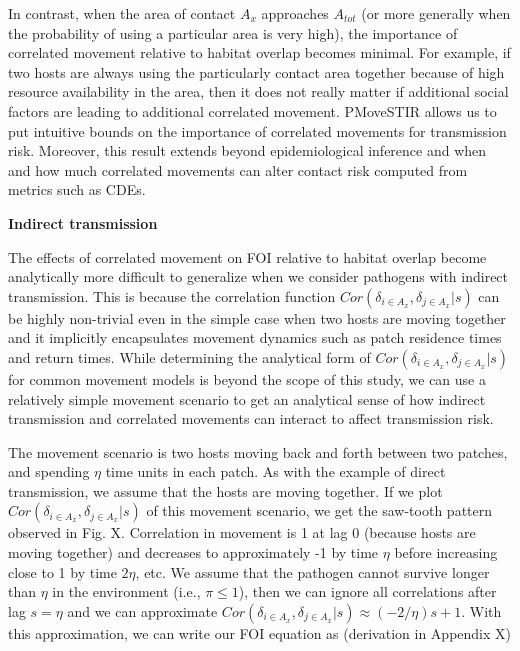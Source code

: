 \documentclass[letterpaper]{article}
\begin{document}
In contrast, when the area of contact $A_x$ approaches $A_{tot}$ (or more generally when the probability of using a particular area is very high), the importance of correlated movement relative to habitat overlap becomes minimal. For example, if two hosts are always using the particularly contact area together because of high resource availability in the area, then it does not really matter if additional social factors are leading to additional correlated movement. PMoveSTIR allows us to put intuitive bounds on the importance of correlated movements for transmission risk. Moreover, this result extends beyond epidemiological inference and when and how much correlated movements can alter contact risk computed from metrics such as CDEs.

\smallskip
\noindent
\textbf{Indirect transmission}

The effects of correlated movement on FOI relative to habitat overlap become analytically more difficult to generalize when we consider pathogens with indirect transmission.  This is because the correlation function $Cor(\delta_{i \in A_x}, \delta_{j \in A_x} | s)$ can be highly non-trivial even in the simple case when two hosts are moving together and it implicitly encapsulates movement dynamics such as patch residence times and return times.  While determining the analytical form of $Cor(\delta_{i \in A_x}, \delta_{j \in A_x} | s)$ for common movement models is beyond the scope of this study, we can use a relatively simple movement scenario to get an analytical sense of how indirect transmission and correlated movements can interact to affect transmission risk.

The movement scenario is two hosts moving back and forth between two patches, and spending $\eta$ time units in each patch.  As with the example of direct transmission, we assume that the hosts are moving together. If we plot $Cor(\delta_{i \in A_x}, \delta_{j \in A_x} | s)$ of this movement scenario, we get the saw-tooth pattern observed in Fig. X.  Correlation in movement is 1 at lag 0 (because hosts are moving together) and decreases to approximately -1 by time $\eta$ before increasing close to 1 by time $2\eta$, etc. We assume that the pathogen cannot survive longer than $\eta$ in the environment (i.e., $\pi \leq 1$), then we can ignore all correlations after lag $s = \eta$ and we can approximate $Cor(\delta_{i \in A_x}, \delta_{j \in A_x} | s) \approx (-2 / \eta)s + 1$.  With this approximation, we can write our FOI equation as (derivation in Appendix X)
\end{document}
